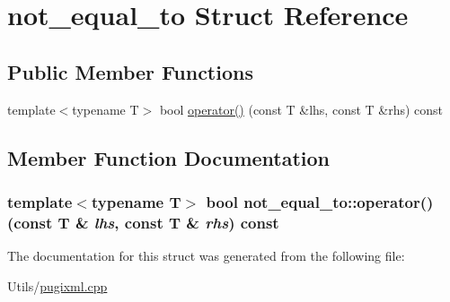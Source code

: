 \hypertarget{structnot__equal__to}{
\section{not\_\-equal\_\-to Struct Reference}
\label{structnot__equal__to}
}
\subsection*{Public Member Functions}
\begin{CompactItemize}
\item 
template$<$typename T$>$ bool \hyperlink{structnot__equal__to_003bf0d318c9d21b8c7f767fb83dc016}{operator()} (const T \&lhs, const T \&rhs) const 
\end{CompactItemize}


\subsection{Member Function Documentation}
\hypertarget{structnot__equal__to_003bf0d318c9d21b8c7f767fb83dc016}{
\subsubsection[operator()]{\setlength{\rightskip}{0pt plus 5cm}template$<$typename T$>$ bool not\_\-equal\_\-to::operator() (const T \& {\em lhs}, const T \& {\em rhs}) const}}
\label{structnot__equal__to_003bf0d318c9d21b8c7f767fb83dc016}




The documentation for this struct was generated from the following file:\begin{CompactItemize}
\item 
Utils/\hyperlink{pugixml_8cpp}{pugixml.cpp}\end{CompactItemize}
